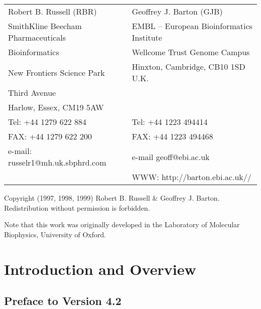 \begin{titlepage}
\begin{tabular}{ll}
Robert B. Russell (RBR)		   & Geoffrey J. Barton (GJB)\\
SmithKline Beecham Pharmaceuticals & EMBL -- European Bioinformatics Institute\\
Bioinformatics                     & Wellcome Trust Genome Campus\\
New Frontiers Science Park         & Hinxton, Cambridge, CB10 1SD U.K.\\
Third Avenue                       & \\
Harlow, Essex, CM19 5AW            & \\
Tel: +44 1279 622 884              & Tel: +44 1223 494414\\
FAX: +44 1279 622 200              & FAX: +44 1223 494468\\
e-mail: russelr1@mh.uk.sbphrd.com  & e-mail geoff@ebi.ac.uk\\
                                   & WWW: http://barton.ebi.ac.uk// \\
\end{tabular}
\vskip 0.25in
\noindent
\begin{center}
Copyright (1997, 1998, 1999) Robert B. Russell \& Geoffrey J. Barton.\\
Redistribution without permission is forbidden.

\vskip 0.1in

Note that this work was originally developed in the Laboratory of Molecular
Biophysics, University of Oxford.
\noindent

\end{center}

\end{titlepage}

\tableofcontents

\parindent 0in

\chapter{Introduction and Overview}

\section{Preface to Version 4.2}

